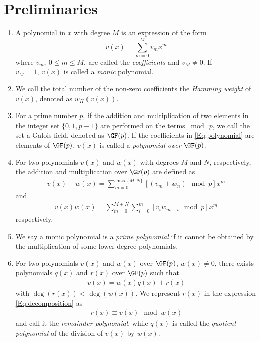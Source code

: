 \section{Preliminaries}
\label{secPrelim}

\begin{enumerate}
\item A polynomial in $x$ with degree $M$ is an expression of the form
\begin{equation}
v(x) = \sum_{m=0}^{M} v_mx^m
\label{Eq:polynomial}
\end{equation}
where $v_m,~0 \leq m \leq M$, are called the \textit{coefficients} and $v_M \neq 0$. If $v_M=1,~v(x)$ is called a \textit{monic} polynomial. 

\item We call the total number of the non-zero coefficients the \textit{Hamming weight} of $v(x)$, denoted as $w_H(v(x))$.

\item For a prime number $p$, if the addition and multiplication of two elements in the integer set $\{ 0,1,p-1\}$ are performed on the terms $\bmod~p$, we call the set a Galois field, denoted as $\GF(p)$. If the coefficients in \eqref{Eq:polynomial} are elements of $\GF(p)$, $v(x)$ is called a {\it polynomial over} $\GF(p)$.

\item For two polynomials $v(x)$ and $w(x)$ with degrees $M$ and $N$, respectively, the addition and multiplication over $\GF(p)$ are defined as 
\begin{align}
v(x)+w(x)=\sum_{m=0}^{\max\{ M,N\}} [(v_m +w_n)\mod p] x^m
\label{Eq:addition}
\end{align}
and
\begin{align}
v(x)w(x)=\sum_{m=0}^{ M+N} \sum_{i=0}^{m} [v_i w_{m-i}\mod p]x^m
\label{Eq:multiplication}
\end{align}
respectively. 

\item We say a monic polynomial is a \textit{prime polynomial} if it cannot be obtained by the multiplication of some lower degree polynomials.

\item For two polynomials $v(x)$ and $w(x)$ over $\GF(p)$, $w(x) \neq 0$, there exists polynomials $q(x)$ and $r(x)$ 
over $\GF(p)$ such that 
\begin{align}
v(x) = w(x)q(x)+r(x)
\label{Eq:decomposition}
\end{align}
with $\deg(r(x)) < \deg(w(x))$. We represent $r(x)$ in the expression \eqref{Eq:decomposition} as
\begin{align}
r(x) \equiv v(x)\mod w(x)
\end{align}
and call it the \textit{remainder polynomial}, while $q(x)$ is called the \textit{quotient polynomial} of the division of $v(x)$ by $w(x)$.


\end{enumerate}
